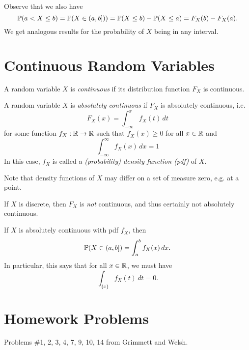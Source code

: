 \begin{remark}
  Observe that we also have
  \[
    \mathbb{P}(a < X \le b)
    = \mathbb{P}(X \in (a, b]))
    = \mathbb{P}(X \le b) - \mathbb{P}(X \le a)
    = F_X(b) - F_X(a).
  \]
  We get analogous results for the probability
  of $X$ being in any interval.
\end{remark}

\section{Continuous Random Variables}
\begin{definition}
  A random variable $X$ is
  \emph{continuous} if its distribution function
  $F_X$ is continuous.
\end{definition}

\begin{definition}
  A random variable $X$ is \emph{absolutely continuous}
  if $F_X$ is absolutely continuous, i.e.
  \[
    F_X(x) = \int_{-\infty}^x f_X(t) \, dt
  \]
  for some function $f_X : \mathbb{R} \to \mathbb{R}$ such that
  $f_X(x) \ge 0$ for all $x \in \mathbb{R}$ and
  \[\int_{-\infty}^\infty f_X(x) \, dx = 1\]
  In this case, $f_X$ is called a
  \emph{(probability) density function (pdf)} of $X$.
\end{definition}

\begin{remark}
  Note that density functions of $X$ may differ
  on a set of measure zero, e.g. at a point.
\end{remark}

\begin{remark}
  If $X$ is discrete, then $F_X$ is
  \emph{not} continuous, and thus certainly
  not absolutely continuous.
\end{remark}

\begin{remark}
  If $X$ is absolutely continuous with pdf
  $f_X$, then
  \[
    \mathbb{P}(X \in (a, b]) = \int_a^b f_X(x) \, dx.
  \]
  In particular, this says that for all $x \in \mathbb{R}$,
  we must have
  \[
    \int_{\{x\}} f_X(t) \, dt = 0.
  \]
\end{remark}

\section{Homework Problems}
Problems \#1, 2, 3, 4, 7, 9, 10, 14 from Grimmett and Welsh.
